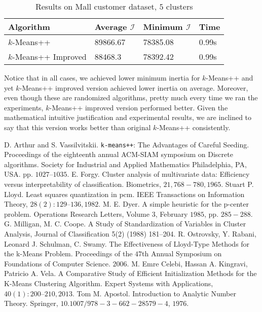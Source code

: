 \documentclass[twoside, 11pt]{article}
\newcommand{\I}{\mathcal{I}}
\begin{document}
		\begin{table}[h]
			\begin{center}
				\begin{tabular}{|l|l|l|l|}
					\hline
					Algorithm & Average $\I$& Minimum $\I$& Time\\\hline
					$k$-Means++ & 89866.67& 78385.08& 0.99s\\\hline
					$k$-Means++ Improved& 88468.3& 78392.42& 0.99s\\\hline
				\end{tabular}
				\caption{Results on Mall customer dataset, $5$ clusters}
			\end{center}
			\label{tbl:mall2}
		\end{table}
	Notice that in all cases, we achieved lower minimum inertia for $k$-Means++ and yet $k$-Means++ improved version achieved lower inertia on average. Moreover, even though these are randomized algorithms, pretty much every time we ran the experiments, $k$-Means++ improved version performed better. Given the mathematical intuitive justification and experimental results, we are inclined to say that this version works better than original $k$-Means++ consistently.
	\begin{thebibliography}{99}
		 D. Arthur and S. Vassilvitskii. \texttt{k-means++}: The Advantages of Careful Seeding. Proceedings of the eighteenth annual ACM-SIAM symposium on Discrete algorithms. Society for Industrial and Applied Mathematics Philadelphia, PA, USA. pp. $1027–1035$.
		 E. Forgy. Cluster analysis of multivariate data: Efficiency versus interpretability of classification. Biometrics, $21, 768-780, 1965$.
		 Stuart P. Lloyd. Least squares quantization in pcm. IEEE Transactions on Information Theory, $28(2):129–136, 1982$.
		 M. E. Dyer. A simple heuristic for the p-center problem. Operations Research Letters, Volume $3$, February $1985$, pp. $285-288$.
		 G. Milligan, M. C. Coope. A Study of Standardization of Variables in Cluster Analysis, Journal of Classification 5(2) (1988) 181–204.
		 R. Ostrovsky, Y. Rabani, Leonard J. Schulman, C. Swamy. The Effectiveness of Lloyd-Type Methods for the k-Means Problem. Proceedings of the $47$th Annual Symposium on Foundations of Computer Science. $2006$.
		 M. Emre Celebi, Hassan A. Kingravi, Patricio A. Vela. A Comparative Study of Efficient Initialization Methods for the K-Means Clustering Algorithm. Expert Systems with Applications, $40(1): 200–210, 2013$.
		 Tom M. Apostol. Introduction to Analytic Number Theory. Springer, $10.1007/978-3-662-28579-4$, $1976$.
	\end{thebibliography}
\end{document}
